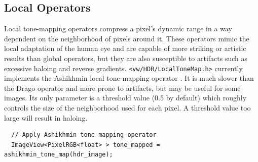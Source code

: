\subsection{Local Operators}
Local tone-mapping operators compress a pixel's dynamic range in a way
dependent on the neighborhood of pixels around it. These operators
mimic the local adaptation of the human eye and are capable of more
striking or artistic results than global operators, but they are also
susceptible to artifacts such as excessive haloing and reverse
gradients. \verb#<vw/HDR/LocalToneMap.h># currently implements the Ashikhmin local
tone-mapping operator \cite{ashikhmin}.  It is much slower than the
Drago operator and more prone to artifacts, but may be useful for some
images. Its only parameter is a threshold value (0.5 by default) which
roughly controls the size of the neighborhood used for each pixel. A
threshold value too large will result in haloing.

\begin{verbatim}
  // Apply Ashikhmin tone-mapping operator 
  ImageView<PixelRGB<float> > tone_mapped = ashikhmin_tone_map(hdr_image);
\end{verbatim}



